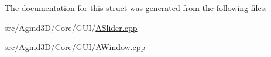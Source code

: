 The documentation for this struct was generated from the following files\+:\begin{DoxyCompactItemize}
\item 
src/\+Agmd3\+D/\+Core/\+G\+U\+I/\hyperlink{_a_slider_8cpp}{A\+Slider.\+cpp}\item 
src/\+Agmd3\+D/\+Core/\+G\+U\+I/\hyperlink{_a_window_8cpp}{A\+Window.\+cpp}\end{DoxyCompactItemize}
